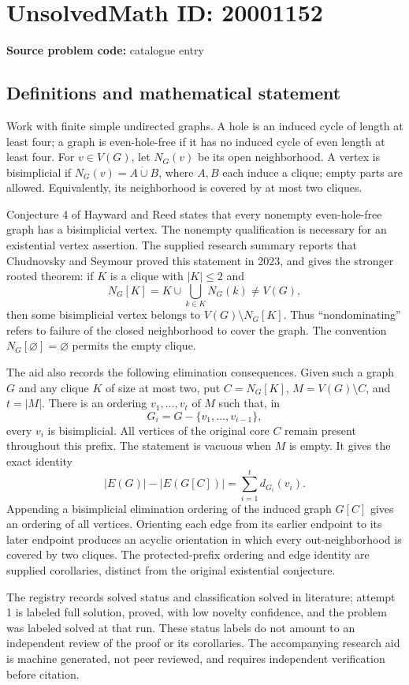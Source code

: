 \documentclass[11pt]{article}
\begin{document}
\section*{UnsolvedMath ID: 20001152}
\textbf{Source problem code:} catalogue entry
\subsection{Definitions and mathematical statement}
Work with finite simple undirected graphs. A hole is an induced cycle of length at least four; a graph is even-hole-free if it has no induced cycle of even length at least four. For \(v\in V(G)\), let \(N_G(v)\) be its open neighborhood. A vertex is bisimplicial if \(N_G(v)=A\mathbin{\dot\cup}B\), where \(A,B\) each induce a clique; empty parts are allowed. Equivalently, its neighborhood is covered by at most two cliques.

Conjecture 4 of Hayward and Reed states that every nonempty even-hole-free graph has a bisimplicial vertex. The nonempty qualification is necessary for an existential vertex assertion. The supplied research summary reports that Chudnovsky and Seymour proved this statement in 2023, and gives the stronger rooted theorem: if \(K\) is a clique with \(|K|\le2\) and
\[
N_G[K]=K\cup\bigcup_{k\in K}N_G(k)\ne V(G),
\]
then some bisimplicial vertex belongs to \(V(G)\setminus N_G[K]\). Thus ``nondominating'' refers to failure of the closed neighborhood to cover the graph. The convention \(N_G[\varnothing]=\varnothing\) permits the empty clique.

The aid also records the following elimination consequences. Given such a graph \(G\) and any clique \(K\) of size at most two, put \(C=N_G[K]\), \(M=V(G)\setminus C\), and \(t=|M|\). There is an ordering \(v_1,\ldots,v_t\) of \(M\) such that, in
\[
G_i=G-\{v_1,\ldots,v_{i-1}\},
\]
every \(v_i\) is bisimplicial. All vertices of the original core \(C\) remain present throughout this prefix. The statement is vacuous when \(M\) is empty. It gives the exact identity
\[
|E(G)|-|E(G[C])|=\sum_{i=1}^t d_{G_i}(v_i).
\]
Appending a bisimplicial elimination ordering of the induced graph \(G[C]\) gives an ordering of all vertices. Orienting each edge from its earlier endpoint to its later endpoint produces an acyclic orientation in which every out-neighborhood is covered by two cliques. The protected-prefix ordering and edge identity are supplied corollaries, distinct from the original existential conjecture.

The registry records solved status and classification solved in literature; attempt 1 is labeled full solution, proved, with low novelty confidence, and the problem was labeled solved at that run. These status labels do not amount to an independent review of the proof or its corollaries. The accompanying research aid is machine generated, not peer reviewed, and requires independent verification before citation.
\end{document}
